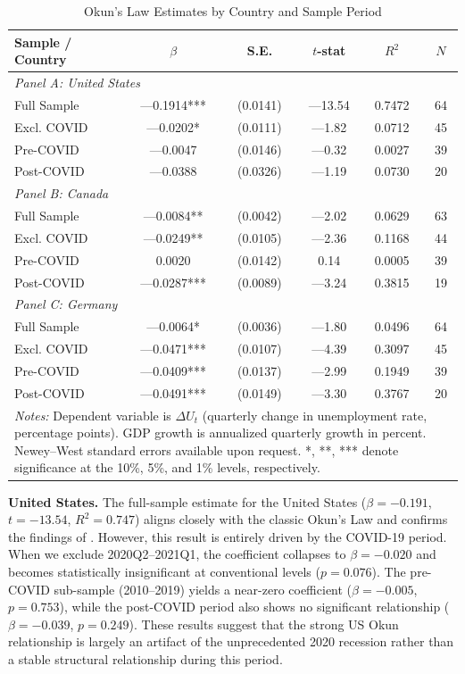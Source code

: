 \documentclass[12pt,a4paper]{article}
\begin{document}
\begin{table}[H]
\centering
\caption{Okun's Law Estimates by Country and Sample Period}
\label{tab:main}
\begin{tabular}{lccccc}
\toprule
\textbf{Sample / Country} & $\beta$ & S.E. & $t$-stat & $R^2$ & $N$ \\
\midrule
\multicolumn{6}{l}{\textit{Panel A: United States}} \\
\quad Full Sample & ---0.1914*** & (0.0141) & ---13.54 & 0.7472 & 64 \\
\quad Excl. COVID & ---0.0202* & (0.0111) & ---1.82 & 0.0712 & 45 \\
\quad Pre-COVID & ---0.0047 & (0.0146) & ---0.32 & 0.0027 & 39 \\
\quad Post-COVID & ---0.0388 & (0.0326) & ---1.19 & 0.0730 & 20 \\
\midrule
\multicolumn{6}{l}{\textit{Panel B: Canada}} \\
\quad Full Sample & ---0.0084** & (0.0042) & ---2.02 & 0.0629 & 63 \\
\quad Excl. COVID & ---0.0249** & (0.0105) & ---2.36 & 0.1168 & 44 \\
\quad Pre-COVID & 0.0020 & (0.0142) & 0.14 & 0.0005 & 39 \\
\quad Post-COVID & ---0.0287*** & (0.0089) & ---3.24 & 0.3815 & 19 \\
\midrule
\multicolumn{6}{l}{\textit{Panel C: Germany}} \\
\quad Full Sample & ---0.0064* & (0.0036) & ---1.80 & 0.0496 & 64 \\
\quad Excl. COVID & ---0.0471*** & (0.0107) & ---4.39 & 0.3097 & 45 \\
\quad Pre-COVID & ---0.0409*** & (0.0137) & ---2.99 & 0.1949 & 39 \\
\quad Post-COVID & ---0.0491*** & (0.0149) & ---3.30 & 0.3767 & 20 \\
\bottomrule
\multicolumn{6}{l}{\textit{Notes:} Dependent variable is $\Delta U_t$ (quarterly change in unemployment rate, percentage points). GDP growth is annualized quarterly growth in percent. Newey--West standard errors available upon request. *, **, *** denote significance at the 10\%, 5\%, and 1\% levels, respectively.}
\end{tabular}
\end{table}

\textbf{United States.} The full-sample estimate for the United States ($\beta = -0.191$, $t = -13.54$, $R^2 = 0.747$) aligns closely with the classic Okun's Law and confirms the findings of \citet{neely2010okun}. However, this result is entirely driven by the COVID-19 period. When we exclude 2020Q2--2021Q1, the coefficient collapses to $\beta = -0.020$ and becomes statistically insignificant at conventional levels ($p = 0.076$). The pre-COVID sub-sample (2010--2019) yields a near-zero coefficient ($\beta = -0.005$, $p = 0.753$), while the post-COVID period also shows no significant relationship ($\beta = -0.039$, $p = 0.249$). These results suggest that the strong US Okun relationship is largely an artifact of the unprecedented 2020 recession rather than a stable structural relationship during this period.
\end{document}
